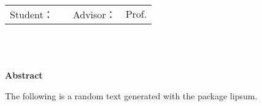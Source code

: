\newpage
\thispagestyle{plain}
\begin{center}
	\TSzTwenty\selectfont
		\textbf{\thesisTitleEn} \\[0.5cm]
	\TSzFourteen\selectfont
		\begin{tabular}{r l r l}
			Student： & \studentEn& \hspace{1cm} Advisor： & Prof. \advisorEn\\
		\end{tabular}
    \\[0.5cm]
	\TSzFourteen\selectfont
	\instituteEn \\[0.5cm]
	\universityEn \\[0.5cm]  
	\textbf{Abstract} \\[0.5cm]
\end{center}

\TSzTwelveThirty\selectfont
The following is a random text generated with the package lipsum.
\lipsum[3-4]
